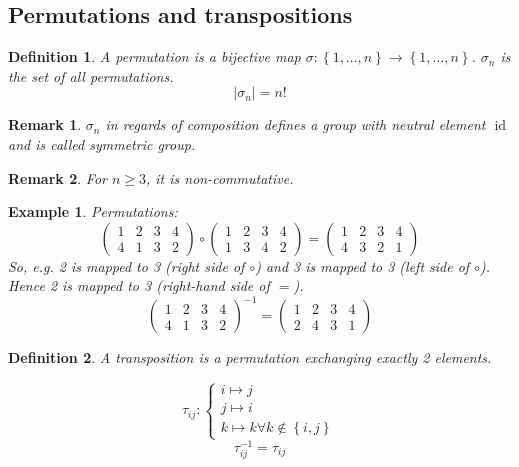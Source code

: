 \documentclass{article}
\newtheorem{example}{Example}  \numberwithin{example}{section}
\newtheorem{definition}{Definition}  \numberwithin{definition}{section}
\newtheorem{remark}{Remark}  \numberwithin{remark}{section}
\newcommand{\set}[1]{\left\{#1\right\}}
\newcommand{\card}[1]{\left|#1\right|}
\begin{document}
\subsection{Permutations and transpositions}

\begin{definition} %
  A \emph{permutation} is a bijective map $\sigma: \set{1,\dots,n} \to \set{1,\dots,n}$.
  $\sigma_n$ is the set of all permutations.
  \[ \card{\sigma_n} = n! \]
\end{definition}

\begin{remark} %
  $\sigma_n$ in regards of composition defines a group with neutral element $\operatorname{id}$
  and is called \emph{symmetric group}.
\end{remark}

\begin{remark} %
  For $n \geq 3$, it is non-commutative.
\end{remark}

\begin{example} %
  Permutations:
  \[ \begin{pmatrix} 1 & 2 & 3 & 4 \\ 4 & 1 & 3 & 2 \end{pmatrix} \circ \begin{pmatrix} 1 & 2 & 3 & 4 \\ 1 & 3 & 4 & 2 \end{pmatrix} = \begin{pmatrix} 1 & 2 & 3 & 4 \\ 4 & 3 & 2 & 1 \end{pmatrix} \]
  So, e.g. 2 is mapped to 3 (right side of $\circ$) and 3 is mapped to 3 (left side of $\circ$). Hence 2 is mapped to 3 (right-hand side of $=$).
  \[ \begin{pmatrix} 1 & 2 & 3 & 4 \\ 4 & 1 & 3 & 2 \end{pmatrix}^{-1} = \begin{pmatrix} 1 & 2 & 3 & 4 \\ 2 & 4 & 3 & 1 \end{pmatrix} \]
\end{example}

\begin{definition}
  A \emph{transposition} is a permutation exchanging exactly 2 elements.

  \[
    \tau_{ij} : \begin{cases}
      i \mapsto j \\
      j \mapsto i \\
      k \mapsto k \forall k \notin \set{i,j}
    \end{cases}
  \] \[
    \tau_{ij}^{-1} = \tau_{ij}
  \]
\end{definition}
\end{document}
